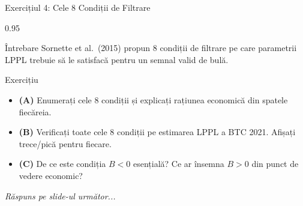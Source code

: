 \documentclass[9pt, aspectratio=169, t]{beamer}
\begin{document}
\begin{frame}{Exercițiul 4: Cele 8 Condiții de Filtrare}
    \begin{cminipage}{0.95\textwidth}
    \begin{alertblock}{Întrebare}
        Sornette et al.\ (2015) propun 8 condiții de filtrare pe care parametrii LPPL trebuie să le satisfacă pentru un semnal valid de bulă.
    \end{alertblock}

    \vspace{0.15cm}

    \begin{block}{Exercițiu}
        \begin{itemize}\setlength{\itemsep}{3pt}
            \item \textcolor{MainBlue}{\textbf{(A)}} Enumerați cele 8 condiții și explicați rațiunea economică din spatele fiecăreia.
            \item \textcolor{MainBlue}{\textbf{(B)}} Verificați toate cele 8 condiții pe estimarea LPPL a BTC 2021. Afișați trece/pică pentru fiecare.
            \item \textcolor{MainBlue}{\textbf{(C)}} De ce este condiția $B < 0$ esențială? Ce ar însemna $B > 0$ din punct de vedere economic?
        \end{itemize}
    \end{block}

    \vspace{0.15cm}

    \begin{center}
        \textit{Răspuns pe slide-ul următor...}
    \end{center}
    \end{cminipage}
\end{frame}
\end{document}
